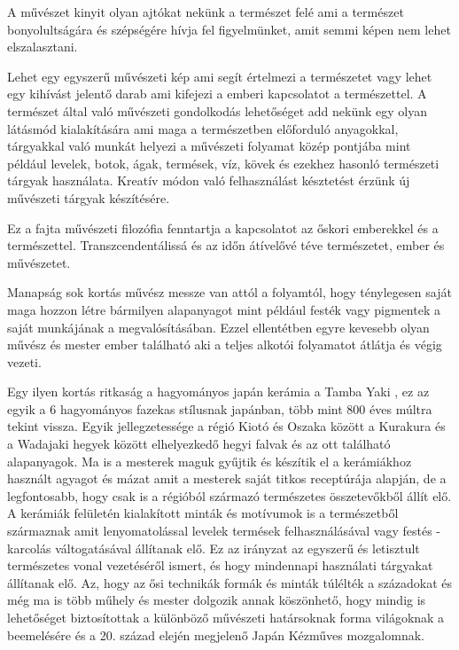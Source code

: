 \documentclass[fontsize=12pt, appendixprefix=true]{scrreprt}
\begin{document}
A művészet kinyit olyan ajtókat nekünk a természet felé ami a természet  bonyolultságára és szépségére hívja fel figyelmünket, amit semmi képen nem lehet elszalasztani.

Lehet egy egyszerű művészeti kép ami segít értelmezi a természetet vagy lehet egy kihívást jelentő darab ami kifejezi a emberi kapcsolatot a természettel.
A természet által való művészeti gondolkodás lehetőséget add nekünk egy olyan látásmód kialakítására ami maga a természetben előforduló anyagokkal, tárgyakkal való munkát helyezi a művészeti folyamat közép pontjába mint például levelek, botok, ágak, termések, víz, kövek és ezekhez hasonló természeti tárgyak használata.
Kreatív módon való felhasználást késztetést érzünk új művészeti tárgyak készítésére.

Ez a fajta művészeti filozófia fenntartja a kapcsolatot az őskori emberekkel és a természettel. Transzcendentálissá és az időn átívelővé téve természetet, ember és művészetet.

Manapság sok kortás művész messze van attól a folyamtól, hogy ténylegesen saját maga hozzon létre bármilyen alapanyagot mint például festék vagy pigmentek a saját munkájának a megvalósításában. Ezzel ellentétben egyre kevesebb olyan művész és mester ember található aki a teljes alkotói folyamatot átlátja és végig vezeti.

\vspace{3 mm}
Egy ilyen kortás ritkaság a hagyományos japán kerámia a Tamba Yaki \cite{tambayaki}, ez az  egyik a 6 hagyományos fazekas stílusnak japánban, több mint 800 éves múltra tekint vissza. Egyik jellegzetessége a régió Kiotó és Oszaka között a Kurakura és a Wadajaki hegyek között elhelyezkedő hegyi falvak és az ott található alapanyagok. Ma is a mesterek maguk gyűjtik és készítik el a kerámiákhoz használt agyagot és mázat amit a mesterek saját titkos receptúrája alapján, de a legfontosabb, hogy csak is a régióból származó természetes összetevőkből állít elő. A kerámiák felületén kialakított minták és motívumok is a természetből származnak amit lenyomatolással levelek termések felhasználásával vagy festés - karcolás váltogatásával állítanak elő. Ez az irányzat az egyszerű és letisztult természetes vonal vezetéséről ismert, és hogy mindennapi használati tárgyakat állítanak elő. Az, hogy az ősi technikák formák és minták túlélték  a századokat és még ma is több műhely és mester dolgozik annak köszönhető, hogy mindig is lehetőséget biztosítottak a különböző művészeti határsoknak forma világoknak a beemelésére és a 20. század elején megjelenő Japán Kézműves mozgalomnak.
\end{document}
